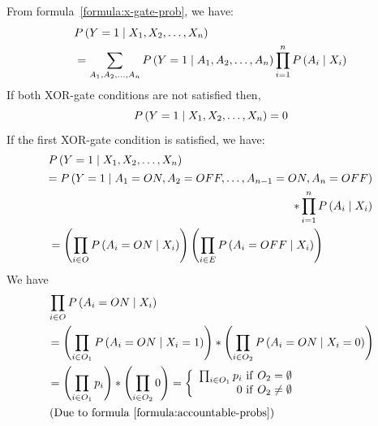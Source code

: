 \documentclass{article}
\numberwithin{equation}{section}
\numberwithin{figure}{section}
\numberwithin{table}{section}
\begin{document}
From formula~\ref{formula:x-gate-prob}, we have:
\begin{align*}
&P\left(Y=1\mathrel{\left|\vphantom{Y=1 X_1,X_2,\dots ,X_n}\right.\kern-\nulldelimiterspace}X_1,X_2,\dots ,X_n\right)\\
&=\sum_{A_1,A_2,\dots ,A_n}{P\left(Y=1\mathrel{\left|\vphantom{Y=1 A_1,A_2,\dots ,A_n}\right.\kern-\nulldelimiterspace}A_1,A_2,\dots ,A_n\right)\prod^n_{i=1}{P\left(A_i\mathrel{\left|\vphantom{A_i X_i}\right.\kern-\nulldelimiterspace}X_i\right)}}
\end{align*}
If both XOR-gate conditions are not satisfied then,
\[P\left(Y=1\mathrel{\left|\vphantom{Y=1 X_1,X_2,\dots ,X_n}\right.\kern-\nulldelimiterspace}X_1,X_2,\dots ,X_n\right)=0\] 
If the first XOR-gate condition is satisfied, we have:
\begin{align*}
&P\left(Y=1\mathrel{\left|\vphantom{Y=1 X_1,X_2,\dots ,X_n}\right.\kern-\nulldelimiterspace}X_1,X_2,\dots ,X_n\right)\\
&\begin{aligned}
=P\left(Y=1\mathrel{\left|\vphantom{Y=1 A_1=ON,A_2=OFF,\dots ,A_{n-1}=ON,A_n=OFF}\right.\kern-\nulldelimiterspace}A_1=ON,A_2=OFF,\dots ,A_{n-1}=ON,A_n=OFF\right)\\
*\prod^n_{i=1}{P\left(A_i\mathrel{\left|\vphantom{A_i X_i}\right.\kern-\nulldelimiterspace}X_i\right)}
\end{aligned}\\
&=\left(\prod_{i\in O}{P\left(A_i=ON\mathrel{\left|\vphantom{A_i=ON X_i}\right.\kern-\nulldelimiterspace}X_i\right)}\right)\left(\prod_{i\in E}{P\left(A_i=OFF\mathrel{\left|\vphantom{A_i=OFF X_i}\right.\kern-\nulldelimiterspace}X_i\right)}\right)
\end{align*}
We have
\begin{align*}
&\prod_{i\in O}{P\left(A_i=ON\mathrel{\left|\vphantom{A_i=ON X_i}\right.\kern-\nulldelimiterspace}X_i\right)}\\
&=\left(\prod_{i\in O_1}{P\left(A_i=ON\mathrel{\left|\vphantom{A_i=ON X_i=1}\right.\kern-\nulldelimiterspace}X_i=1\right)}\right)*\left(\prod_{i\in O_2}{P\left(A_i=ON\mathrel{\left|\vphantom{A_i=ON X_i=0}\right.\kern-\nulldelimiterspace}X_i=0\right)}\right)\\
&=\left(\prod_{i\in O_1}{p_i}\right)*\left(\prod_{i\in O_2}{0}\right)=\left\{ \begin{array}{r}
\prod_{i\in O_1}{p_i}\ \mathrm{if}\ O_2=\emptyset  \\ 
0\ \mathrm{if}\ O_2\neq \emptyset  \end{array}
\right.\\
&\left(\mathrm{Due\ to\ formula~\ref{formula:accountable-probs}}\right)
\end{align*}
\end{document}
